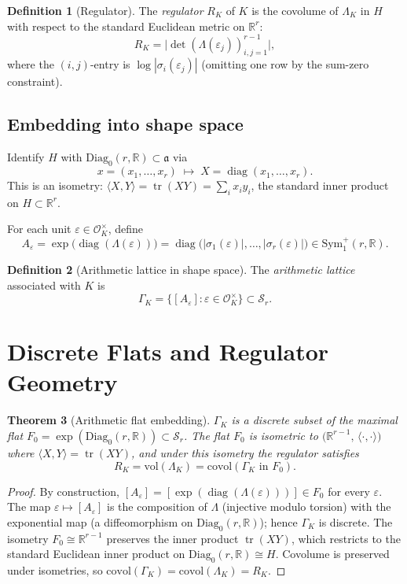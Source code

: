 \documentclass[12pt]{article}
\newtheorem{theorem}{Theorem}[section]
\theoremstyle{definition}
\newtheorem{definition}[theorem]{Definition}
\theoremstyle{remark}
\newcommand{\R}{\mathbb{R}}
\newcommand{\Symp}{\mathrm{Sym}^{+}}
\newcommand{\Diagz}{\mathrm{Diag}_{0}}
\newcommand{\calM}{\mathcal{S}}
\newcommand{\tr}{\operatorname{tr}}
\newcommand{\diag}{\operatorname{diag}}
\begin{document}
\begin{definition}[Regulator]
The \emph{regulator} $R_K$ of $K$ is the covolume of $\Lambda_K$ in
$H$ with respect to the standard Euclidean metric on $\R^r$:
\[
  R_K = \bigl|\det(\Lambda(\varepsilon_j))_{i,j=1}^{r-1}\bigr|,
\]
where the $(i,j)$-entry is $\log|\sigma_i(\varepsilon_j)|$
(omitting one row by the sum-zero constraint).
\end{definition}

\subsection{Embedding into shape space}

Identify $H$ with $\Diagz(r,\R) \subset \mathfrak{a}$ via
\[
  x = (x_1,\ldots,x_r) \;\mapsto\; X = \diag(x_1,\ldots,x_r).
\]
This is an isometry: $\langle X, Y\rangle = \tr(XY) = \sum_i x_i y_i$,
the standard inner product on $H \subset \R^r$.

For each unit $\varepsilon \in \mathcal{O}_K^\times$, define
\[
  A_\varepsilon = \exp\!\bigl(\diag(\Lambda(\varepsilon))\bigr)
  = \diag\!\bigl(|\sigma_1(\varepsilon)|,\ldots,|\sigma_r(\varepsilon)|\bigr)
  \in \Symp_1(r,\R).
\]

\begin{definition}[Arithmetic lattice in shape space]
The \emph{arithmetic lattice} associated with $K$ is
\[
  \Gamma_K = \{[A_\varepsilon] : \varepsilon \in \mathcal{O}_K^\times\}
  \subset \calM_r.
\]
\end{definition}

\section{Discrete Flats and Regulator Geometry}
\label{sec:flats}

\begin{theorem}[Arithmetic flat embedding]
\label{thm:flatembedding}
$\Gamma_K$ is a discrete subset of the maximal flat
$F_0 = \exp(\Diagz(r,\R)) \subset \calM_r$.
The flat $F_0$ is isometric to $\bigl(\R^{r-1},\,\langle\cdot,\cdot\rangle\bigr)$
where $\langle X,Y\rangle = \tr(XY)$,
and under this isometry the regulator satisfies
\[
  R_K = \mathrm{vol}(\Lambda_K) = \mathrm{covol}(\Gamma_K \text{ in } F_0).
\]
\end{theorem}

\begin{proof}
By construction, $[A_\varepsilon] = [\exp(\diag(\Lambda(\varepsilon)))]
\in F_0$ for every $\varepsilon$.
The map $\varepsilon \mapsto [A_\varepsilon]$ is the composition of
$\Lambda$ (injective modulo torsion) with the exponential map
(a diffeomorphism on $\Diagz(r,\R)$); hence $\Gamma_K$ is discrete.
The isometry $F_0 \cong \R^{r-1}$ preserves the inner product
$\tr(XY)$, which restricts to the standard Euclidean inner product on
$\Diagz(r,\R) \cong H$.
Covolume is preserved under isometries, so
$\mathrm{covol}(\Gamma_K) = \mathrm{covol}(\Lambda_K) = R_K$.
\end{proof}
\end{document}
